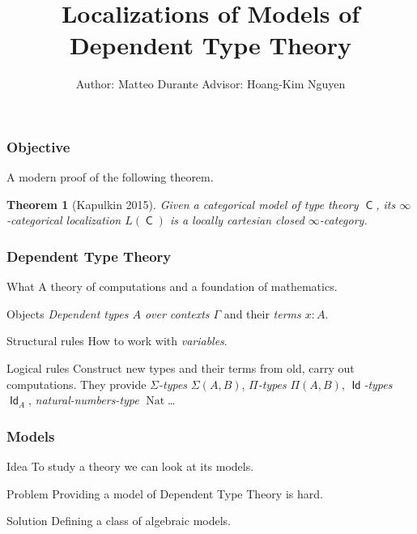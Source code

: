 \documentclass{beamer}
\title{Localizations of Models of Dependent Type Theory}
\author{Author: Matteo Durante \quad\quad\quad Advisor: Hoang-Kim Nguyen}
\institute{Regensburg University}
\DeclareMathOperator{\Id}{\mathsf{Id}}
\DeclareMathOperator{\sfC}{\mathsf{C}}
\DeclareMathOperator{\nat}{Nat}
\begin{document}
\theoremstyle{plain}

\newtheorem{thm}{Theorem}[section]
\newtheorem{prop}{Proposition}[section]
\newtheorem{defn}{Definition}[section]
\newtheorem{conj}{Conjecture}[section]
\newtheorem{lem}{Lemma}[section]

\frame{\titlepage}

\begin{frame}
  \frametitle{Objective}

  A modern proof of the following theorem.

  \begin{thm}[Kapulkin 2015]
    Given a categorical model of type theory $\sfC$, its $\infty$-categorical
    localization $L(\sfC)$ is a locally cartesian closed $\infty$-category.
  \end{thm}
\end{frame}

\begin{frame}
  \frametitle{Dependent Type Theory}
  
  \begin{block}{What}
    A theory of computations and a foundation of mathematics.
  \end{block}
  \pause

  \begin{block}{Objects}
    \emph{Dependent types $A$ over contexts
    $\Gamma$} and their \emph{terms $x:A$}.
  \end{block}
  \pause

  \begin{block}{Structural rules}
    How to work with \emph{variables}.
  \end{block}
  \pause

  \begin{block}{Logical rules}
    Construct new types and their terms from old, carry out
    computations. They provide \emph{$\Sigma$-types}
    $\Sigma(A,B)$, \emph{$\Pi$-types}
    $\Pi(A,B)$, \emph{$\Id$-types} $\Id_A$, \emph{natural-numbers-type}
    $\nat$\ldots
  \end{block}
\end{frame}

\begin{frame}
  \frametitle{Models}

  \begin{block}{Idea}
    To study a theory we can look at its models.
  \end{block}
  \pause

  \begin{block}{Problem}
    Providing a model of Dependent Type Theory is hard.
  \end{block}
  \pause

  \begin{block}{Solution}
    Defining a class of algebraic models.
  \end{block}
\end{frame}
\end{document}
